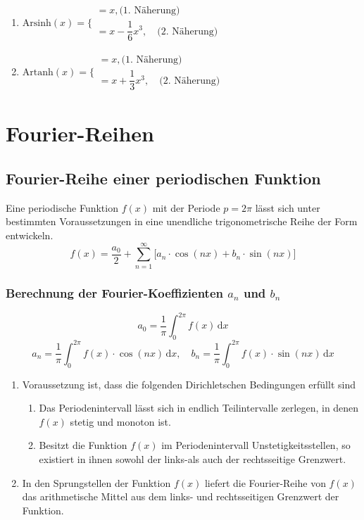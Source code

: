 \begin{enumerate}[$(a)$]
\item $\text{Arsinh}\left(x\right)=\Bigg\{\begin{matrix}=x,\text{(1. Näherung)}\\=x-\dfrac{1}{6}x^3,\quad \text{(2. Näherung)}\end{matrix}$
\item $\text{Artanh}\left(x\right)=\Bigg\{\begin{matrix}=x,\text{(1. Näherung)}\\=x+\dfrac{1}{3}x^3,\quad \text{(2. Näherung)}\end{matrix}$
\end{enumerate}
\section{Fourier-Reihen}
\subsection{Fourier-Reihe einer periodischen Funktion}
Eine periodische Funktion $f\left(x\right)$ mit der Periode $p=2\pi$ lässt sich unter bestimmten Voraussetzungen in eine unendliche trigonometrische Reihe der Form entwickeln.
\begin{equation}
\boxed{f\left(x\right)=\dfrac{a_0}{2}+\displaystyle \sum_{n=1}^{\infty}\Big[a_n\cdot \cos\left(nx\right)+b_n\cdot \sin\left(nx\right)\Big]}
\end{equation}
\subsubsection{Berechnung der Fourier-Koeffizienten $a_n$ und $b_n$}
\begin{equation}
\boxed{a_0=\dfrac{1}{\pi}\displaystyle \int_0^{2\pi}f\left(x\right)\,\text{d}x}
\end{equation}
\begin{equation}
\boxed{a_n=\dfrac{1}{\pi}\displaystyle \int_0^{2\pi}f\left(x\right)\cdot \cos\left(nx\right)\,\text{d}x,\quad b_n=\dfrac{1}{\pi}\displaystyle \int_0^{2\pi}f\left(x\right)\cdot \sin\left(nx\right)\,\text{d}x}
\end{equation}
\begin{enumerate}[$(1)$]
\item Voraussetzung ist, dass die folgenden Dirichletschen Bedingungen erfüllt sind
\begin{enumerate}[$(a)$]
\item Das Periodenintervall lässt sich in endlich Teilintervalle zerlegen, in denen $f\left(x\right)$ stetig und monoton ist.
\item Besitzt die Funktion $f\left(x\right)$ im Periodenintervall Unstetigkeitsstellen, so existiert in ihnen sowohl der links-als auch der rechtsseitige Grenzwert. 
\end{enumerate}
\item In den Sprungstellen der Funktion $f\left(x\right)$ liefert die Fourier-Reihe von $f\left(x\right)$ das arithmetische Mittel aus dem links- und rechtsseitigen Grenzwert der Funktion.
\end{enumerate}
